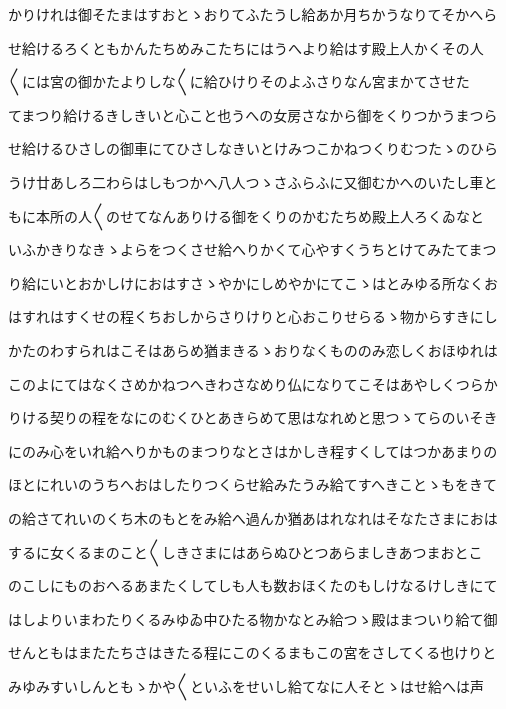 \documentclass[a4paper,11pt,landscape]{ltjtarticle}
\begin{document}
\par\medskip
かりけれは御そたまはすおとゝおりてふたうし給あか月ちかうなりてそかへら
\par\medskip
せ給けるろくともかんたちめみこたちにはうへより給はす殿上人かくその人
\par\medskip
〱には宮の御かたよりしな〱に給ひけりそのよふさりなん宮まかてさせた
\par\medskip
てまつり給けるきしきいと心こと也うへの女房さなから御をくりつかうまつら
\par\medskip
せ給けるひさしの御車にてひさしなきいとけみつこかねつくりむつたゝのひら
\par\medskip
うけ廿あしろ二わらはしもつかへ八人つゝさふらふに又御むかへのいたし車と
\par\medskip
もに本所の人〱のせてなんありける御をくりのかむたちめ殿上人ろくゐなと
\par\medskip
いふかきりなきゝよらをつくさせ給へりかくて心やすくうちとけてみたてまつ
\par\medskip
り給にいとおかしけにおはすさゝやかにしめやかにてこゝはとみゆる所なくお
\par\medskip
はすれはすくせの程くちおしからさりけりと心おこりせらるゝ物からすきにし
\par\medskip
かたのわすられはこそはあらめ猶まきるゝおりなくもののみ恋しくおほゆれは
\par\medskip
このよにてはなくさめかねつへきわさなめり仏になりてこそはあやしくつらか
\par\medskip
りける契りの程をなにのむくひとあきらめて思はなれめと思つゝてらのいそき
\par\medskip
にのみ心をいれ給へりかものまつりなとさはかしき程すくしてはつかあまりの
\par\medskip
ほとにれいのうちへおはしたりつくらせ給みたうみ給てすへきことゝもをきて
\par\medskip
の給さてれいのくち木のもとをみ給へ過んか猶あはれなれはそなたさまにおは
\par\medskip
するに女くるまのこと〱しきさまにはあらぬひとつあらましきあつまおとこ
\par\medskip
のこしにものおへるあまたくしてしも人も数おほくたのもしけなるけしきにて
\par\medskip
はしよりいまわたりくるみゆゐ中ひたる物かなとみ給つゝ殿はまついり給て御
\par\medskip
せんともはまたたちさはきたる程にこのくるまもこの宮をさしてくる也けりと
\par\medskip
みゆみすいしんともゝかや〱といふをせいし給てなに人そとゝはせ給へは声
\par\medskip
\end{document}
